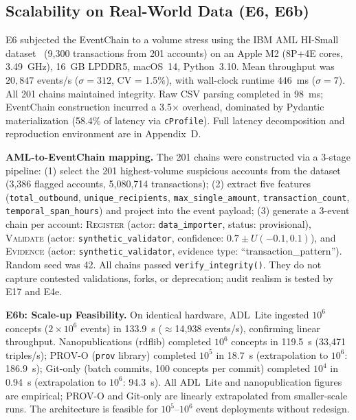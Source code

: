 \subsection{Scalability on Real-World Data (E6, E6b)}\label{subsec:scalability}

E6 subjected the EventChain to a volume stress using the IBM AML HI-Small dataset~\cite{ibm_aml} (9,300 transactions from 201 accounts) on an Apple M2 (8P+4E cores, 3.49~GHz), 16~GB LPDDR5, macOS~14, Python~3.10. Mean throughput was $20{,}847$ events/s ($\sigma = 312$, CV = 1.5\%), with wall-clock runtime $446$~ms ($\sigma = 7$). All 201 chains maintained integrity. Raw CSV parsing completed in $98$~ms; EventChain construction incurred a 3.5$\times$ overhead, dominated by Pydantic materialization (58.4\% of latency via \texttt{cProfile}). Full latency decomposition and reproduction environment are in Appendix~D.

\textbf{AML-to-EventChain mapping.} The 201 chains were constructed via a 3-stage pipeline: (1) select the 201 highest-volume suspicious accounts from the dataset (3,386 flagged accounts, 5,080,714 transactions); (2) extract five features (\texttt{total\_outbound}, \texttt{unique\_recipients}, \texttt{max\_single\_amount}, \texttt{transaction\_count}, \texttt{temporal\_span\_hours}) and project into the event payload; (3) generate a 3-event chain per account: \textsc{Register} (actor: \texttt{data\_importer}, status: provisional), \textsc{Validate} (actor: \texttt{synthetic\_validator}, confidence: $0.7 \pm U(-0.1, 0.1)$), and \textsc{Evidence} (actor: \texttt{synthetic\_validator}, evidence type: ``transaction\_pattern''). Random seed was 42. All chains passed \texttt{verify\_integrity()}. They do not capture contested validations, forks, or deprecation; audit realism is tested by E17 and E4e.

\textbf{E6b: Scale-up Feasibility.} On identical hardware, ADL~Lite ingested $10^6$ concepts ($2 \times 10^6$ events) in 133.9~s ($\approx$14,938 events/s), confirming linear throughput. Nanopublications (rdflib) completed $10^6$ concepts in 119.5~s (33,471 triples/s); PROV-O (\texttt{prov} library) completed $10^5$ in 18.7~s (extrapolation to $10^6$: 186.9~s); Git-only (batch commits, 100 concepts per commit) completed $10^4$ in 0.94~s (extrapolation to $10^6$: 94.3~s). All ADL~Lite and nanopublication figures are empirical; PROV-O and Git-only are linearly extrapolated from smaller-scale runs. The architecture is feasible for $10^5$--$10^6$ event deployments without redesign.

